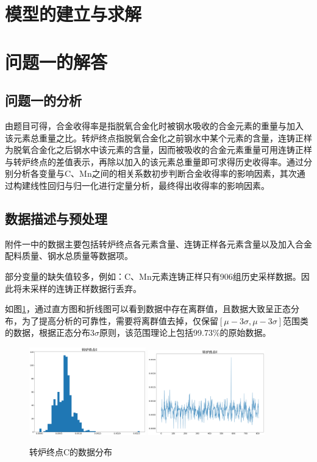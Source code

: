 \documentclass{xcumcmart}
\begin{document}
\section{模型的建立与求解}
\section{问题一的解答}
\subsection{问题一的分析}
\par 由题目可得，合金收得率是指脱氧合金化时被钢水吸收的合金元素的重量与加入 该元素总重量之比。转炉终点指脱氧合金化之前钢水中某个元素的含量，连铸正样为脱氧合金化之后钢水中该元素的含量，因而被吸收的合金元素重量可用连铸正样与转炉终点的差值表示，再除以加入的该元素总重量即可求得历史收得率。通过分别分析各变量与C、Mn之间的相关系数初步判断合金收得率的影响因素，其次通过构建线性回归与归一化进行定量分析，最终得出收得率的影响因素。
\subsection{数据描述与预处理}
\par 附件一中的数据主要包括转炉终点各元素含量、连铸正样各元素含量以及加入合金配料质量、钢水总质量等数据项。
\par 部分变量的缺失值较多，例如：C、Mn元素连铸正样只有906组历史采样数据。因此将未采样的连铸正样数据行丢弃。
\par 如图\ref{fig:prev}，通过直方图和折线图可以看到数据中存在离群值，且数据大致呈正态分布，为了提高分析的可靠性，需要将离群值去掉，仅保留$[\mu-3\sigma,\mu-3\sigma]$范围类的数据，根据正态分布3$\sigma$原则，该范围理论上包括99.73\%的原始数据。
\begin{figure}[htbp]
	\centering
	\includegraphics[width=0.45\textwidth]{fig/hist.png}
	\includegraphics[width=0.45\textwidth]{fig/index.png}
	\caption{转炉终点C的数据分布\label{fig:prev}}
\end{figure}
\end{document}
